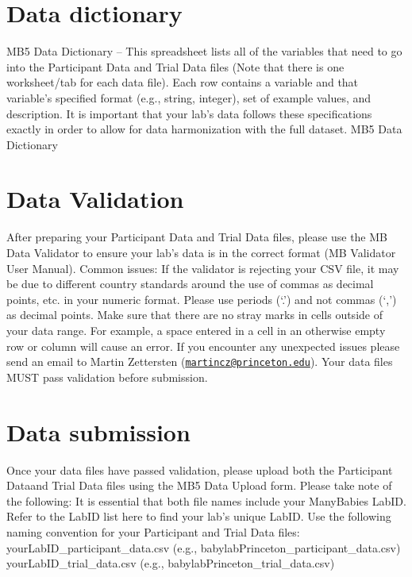 \documentclass[
]{book}
\begin{document}
\section{Data dictionary}\label{data-dictionary}

MB5 Data Dictionary -- This spreadsheet lists all of the variables that need to go into the Participant Data and Trial Data files (Note that there is one worksheet/tab for each data file). Each row contains a variable and that variable's specified format (e.g., string, integer), set of example values, and description. It is important that your lab's data follows these specifications exactly in order to allow for data harmonization with the full dataset.
MB5 Data Dictionary

\section{Data Validation}\label{data-validation}

After preparing your Participant Data and Trial Data files, please use the MB Data Validator to ensure your lab's data is in the correct format (MB Validator User Manual).
Common issues:
If the validator is rejecting your CSV file, it may be due to different country standards around the use of commas as decimal points, etc. in your numeric format. Please use periods (`.') and not commas (`,') as decimal points.
Make sure that there are no stray marks in cells outside of your data range. For example, a space entered in a cell in an otherwise empty row or column will cause an error.
If you encounter any unexpected issues please send an email to Martin Zettersten (\href{mailto:martincz@princeton.edu}{\nolinkurl{martincz@princeton.edu}}). Your data files MUST pass validation before submission.

\section{Data submission}\label{data-submission}

Once your data files have passed validation, please upload both the Participant Dataand Trial Data files using the MB5 Data Upload form. Please take note of the following:
It is essential that both file names include your ManyBabies LabID. Refer to the LabID list here to find your lab's unique LabID.
Use the following naming convention for your Participant and Trial Data files:
yourLabID\_participant\_data.csv (e.g., babylabPrinceton\_participant\_data.csv)
yourLabID\_trial\_data.csv (e.g., babylabPrinceton\_trial\_data.csv)
\end{document}
